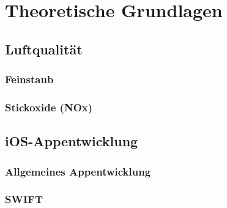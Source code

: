 
\chapter{Theoretische Grundlagen}\label{cha:Grundlagen}

\section{Luftqualität}\label{sec:Luftqualität}

\subsection{Feinstaub}\label{subsec:Feinstaub}

\subsection{Stickoxide (NOx)}\label{subsec:NOx}

\section{iOS-Appentwicklung}\label{sec:ioS-Appentwicklung}

\subsection{Allgemeines Appentwicklung}\label{subsec:Allgemeines Appentwicklung}

\subsection{SWIFT}\label{subsec:SWIFT}

